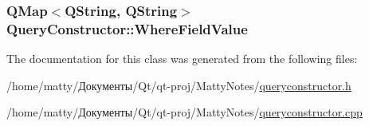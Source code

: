 \subsubsection[{\texorpdfstring{Where\+Field\+Value}{WhereFieldValue}}]{\setlength{\rightskip}{0pt plus 5cm}Q\+Map$<$Q\+String, Q\+String$>$ Query\+Constructor\+::\+Where\+Field\+Value\hspace{0.3cm}{\ttfamily [private]}}\hypertarget{class_query_constructor_ad20cc356b8452f51ddb326e989b3db9d}{}\label{class_query_constructor_ad20cc356b8452f51ddb326e989b3db9d}


The documentation for this class was generated from the following files\+:\begin{DoxyCompactItemize}
\item 
/home/matty/Документы/\+Qt/qt-\/proj/\+Matty\+Notes/\hyperlink{queryconstructor_8h}{queryconstructor.\+h}\item 
/home/matty/Документы/\+Qt/qt-\/proj/\+Matty\+Notes/\hyperlink{queryconstructor_8cpp}{queryconstructor.\+cpp}\end{DoxyCompactItemize}
